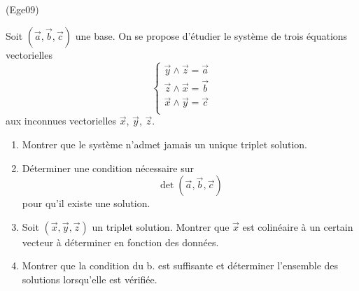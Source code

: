 \begin{tiny}(Ege09)\end{tiny} Soit $(\overrightarrow a , \overrightarrow b , \overrightarrow c)$ une base. On se propose d'étudier le système de trois équations vectorielles
\begin{displaymath}
 \left\lbrace 
\begin{aligned}
 \overrightarrow y \wedge \overrightarrow z = \overrightarrow a\\
 \overrightarrow z \wedge \overrightarrow x = \overrightarrow b\\
 \overrightarrow x \wedge \overrightarrow y = \overrightarrow c\\
\end{aligned}
\right. 
\end{displaymath}
aux inconnues vectorielles $\overrightarrow x$, $\overrightarrow y$, $\overrightarrow z$.
\begin{enumerate}
 \item Montrer que le système n'admet jamais un unique triplet solution.
 \item Déterminer une condition nécessaire sur 
\begin{displaymath}
 \det(\overrightarrow a , \overrightarrow b , \overrightarrow c)
\end{displaymath}
pour qu'il existe une solution.
\item Soit $(\overrightarrow x , \overrightarrow y , \overrightarrow z)$ un triplet solution. Montrer que $\overrightarrow x$ est colinéaire à un certain vecteur à déterminer en fonction des données.
\item Montrer que la condition du b. est suffisante et déterminer l'ensemble des solutions lorsqu'elle est vérifiée.
\end{enumerate}
  